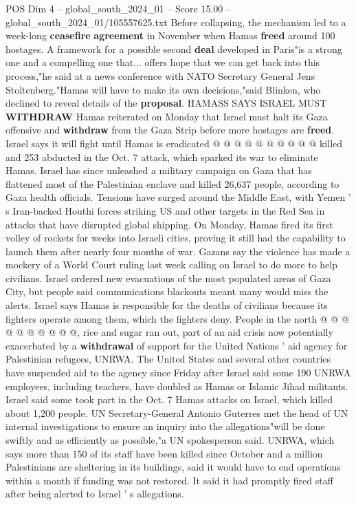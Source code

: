 \begin{textsample}{POS Dim 4 – global\_south\_2024\_01 – Score 15.00 – global\_south\_2024\_01/105557625.txt}
Before collapsing, the mechanism led to a week-long \textbf{ceasefire} \textbf{agreement} in November when Hamas \textbf{freed} around 100 hostages.
A framework for a possible second \textbf{deal} developed in Paris"is a strong one and a compelling one that... offers hope that we can get back into this process,"he said at a news conference with NATO Secretary General Jens Stoltenberg."Hamas will have to make its own decisions,"said Blinken, who declined to reveal details of the \textbf{proposal}.
HAMASS SAYS ISRAEL MUST \textbf{WITHDRAW} Hamas reiterated on Monday that Israel must halt its Gaza offensive and \textbf{withdraw} from the Gaza Strip before more hostages are \textbf{freed}.
Israel says it will fight until Hamas is eradicated @ @ @ @ @ @ @ @ @ @ killed and 253 abducted in the Oct. 7 attack, which sparked its war to eliminate Hamas.
Israel has since unleashed a military campaign on Gaza that has flattened most of the Palestinian enclave and killed 26,637 people, according to Gaza health officials.
Tensions have surged around the Middle East, with Yemen ' s Iran-backed Houthi forces striking US and other targets in the Red Sea in attacks that have disrupted global shipping.
On Monday, Hamas fired its first volley of rockets for weeks into Israeli cities, proving it still had the capability to launch them after nearly four months of war.
Gazans say the violence has made a mockery of a World Court ruling last week calling on Israel to do more to help civilians.
Israel ordered new evacuations of the most populated areas of Gaza City, but people said communications blackouts meant many would miss the alerts.
Israel says Hamas is responsible for the deaths of civilians because its fighters operate among them, which the fighters deny.
People in the north @ @ @ @ @ @ @ @ @ @, rice and sugar ran out, part of an aid crisis now potentially exacerbated by a \textbf{withdrawal} of support for the United Nations ' aid agency for Palestinian refugees, UNRWA.
The United States and several other countries have suspended aid to the agency since Friday after Israel said some 190 UNRWA employees, including teachers, have doubled as Hamas or Islamic Jihad militants.
Israel said some took part in the Oct. 7 Hamas attacks on Israel, which killed about 1,200 people.
UN Secretary-General Antonio Guterres met the head of UN internal investigations to ensure an inquiry into the allegations"will be done swiftly and as efficiently as possible,"a UN spokesperson said.
UNRWA, which says more than 150 of its staff have been killed since October and a million Palestinians are sheltering in its buildings, said it would have to end operations within a month if funding was not restored.
It said it had promptly fired staff after being alerted to Israel ' s allegations.

\end{textsample}
